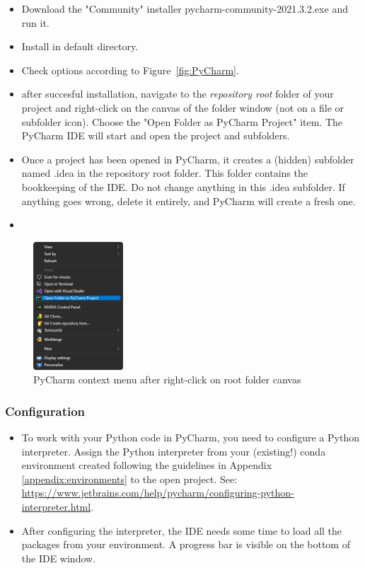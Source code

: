 \begin{itemize}
	\item Download the "Community" installer \textsf{pycharm-community-2021.3.2.exe} and run it.
	\item Install in default directory.
	\item Check options according to Figure~\ref{fig:PyCharm}.
	\item after succesful installation, navigate to the \emph{repository root} folder of your project and right-click on the canvas of the folder window (not on a file or subfolder icon). Choose the "Open Folder as PyCharm Project" item. The PyCharm IDE will start and open the project and subfolders.
	\item Once a project has been opened in PyCharm, it creates a (hidden) subfolder named \textsf{.idea} in the repository root folder. This folder contains the bookkeeping of the IDE. Do not change anything in this \textsf{.idea} subfolder. If anything goes wrong, delete it entirely, and PyCharm will create a fresh one.
	\item 
\end{itemize}

\begin{figure}[H]
	\centering
	\includegraphics[width=0.3\textwidth]{Figures/context_menu_pycharm.jpg}
	\caption{PyCharm context menu after right-click on root folder canvas}
	\label{fig:contextmenu_pycharm}
\end{figure}

\subsubsection{Configuration}

\begin{itemize}
	\item To work with your Python code in PyCharm, you need to configure a Python interpreter. Assign the Python interpreter from your (existing!) \textsf{conda} environment created following the guidelines in Appendix \ref{appendix:environments} to the open project. See: \url{https://www.jetbrains.com/help/pycharm/configuring-python-interpreter.html}.
	\item After configuring the interpreter, the IDE needs some time to load all the packages from your environment. A progress bar is visible on the bottom of the IDE window.
\end{itemize}

